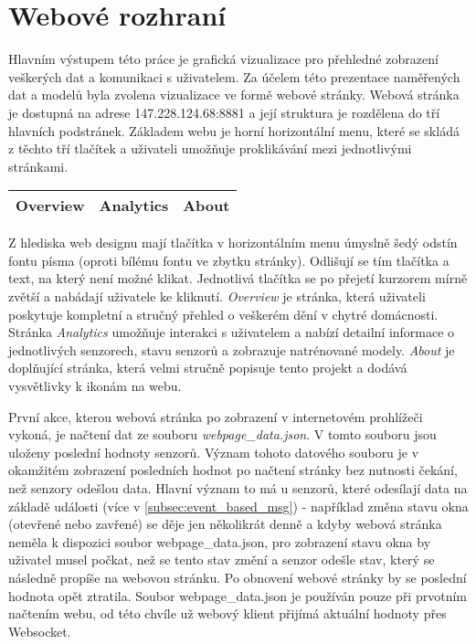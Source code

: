 \chapter{Webové rozhraní} \label{chap:web_page}

Hlavním výstupem této práce je grafická vizualizace pro přehledné zobrazení veškerých dat a komunikaci s uživatelem. Za účelem této prezentace naměřených dat a modelů byla zvolena vizualizace ve formě webové stránky. Webová stránka je dostupná na adrese 147.228.124.68:8881 a její struktura je rozdělena do tří hlavních podstránek. Základem webu je horní horizontální menu, které se skládá z těchto tří tlačítek a uživateli umožňuje proklikávání mezi jednotlivými stránkami.

\begin{table}[h!]
\centering
\begin{tabular}{|P{2.5cm}|P{2.5cm}|P{2.5cm}|} 
 \hline
 Overview & Analytics & About \\
 \hline
\end{tabular}
\end{table}

Z hlediska web designu mají tlačítka v horizontálním menu úmyslně šedý odstín fontu písma (oproti bílému fontu ve zbytku stránky). Odlišují se tím tlačítka a text, na který není možné klikat. Jednotlivá tlačítka se po přejetí kurzorem mírně zvětší a nabádají uživatele ke kliknutí. \textit{Overview} je stránka, která uživateli poskytuje kompletní a stručný přehled o veškerém dění v chytré domácnosti. Stránka \textit{Analytics} umožňuje interakci s uživatelem a nabízí detailní informace o jednotlivých senzorech, stavu senzorů a zobrazuje natrénované modely. \textit{About} je doplňující stránka, která velmi stručně popisuje tento projekt a dodává vysvětlivky k ikonám na webu. \par
První akce, kterou webová stránka po zobrazení v internetovém prohlížeči vykoná, je načtení dat ze souboru \textit{webpage\_data.json}. V tomto souboru jsou uloženy poslední hodnoty senzorů. Význam tohoto datového souboru je v okamžitém zobrazení posledních hodnot po načtení stránky bez nutnosti čekání, než senzory odešlou data. Hlavní význam to má u senzorů, které odesílají data na základě události (více v \cref{subsec:event_based_msg}) - například změna stavu okna (otevřené nebo zavřené) se děje jen několikrát denně a kdyby webová stránka neměla k dispozici soubor webpage\_data.json, pro zobrazení stavu okna by uživatel musel počkat, než se tento stav změní a senzor odešle stav, který se následně propíše na webovou stránku. Po obnovení webové stránky by se poslední hodnota opět ztratila. Soubor webpage\_data.json je používán pouze při prvotním načtením webu, od této chvíle už webový klient přijímá aktuální hodnoty přes Websocket.  

